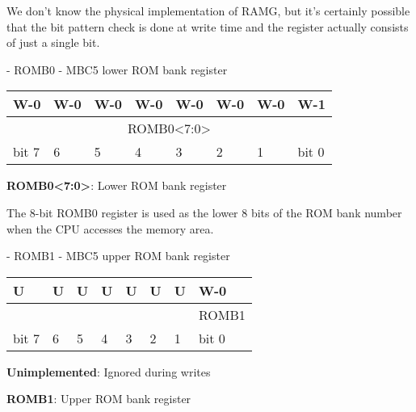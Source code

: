 \begin{speculation}
  We don't know the physical implementation of RAMG, but it's certainly
  possible that the  bit pattern check is done at write time and the
  register actually consists of just a single bit.
\end{speculation}

\begin{register}[H]
  \caption{ - ROMB0 - MBC5 lower ROM bank register}

  {
    \ttfamily
    \begin{tabularx}{\textwidth}{|X|X|X|X|X|X|X|X|}
      \hline
      W-0 & W-0 & W-0 & W-0 & W-0 & W-0 & W-0 & W-1 \\
      \hline
      \multicolumn{8}{|c|}{ROMB0<7:0>} \\
      \hline
      bit 7 & 6 & 5 & 4 & 3 & 2 & 1 & bit 0 \\
      \hline
    \end{tabularx}
  }

  \begin{description}[leftmargin=5em, style=nextline]
    \item[bit 7-0]
      \textbf{ROMB0<7:0>}: Lower ROM bank register \\
  \end{description}
\end{register}

The 8-bit ROMB0 register is used as the lower 8 bits of the ROM bank number
when the CPU accesses the  memory area.

\begin{register}[H]
  \caption{ - ROMB1 - MBC5 upper ROM bank register}

  {
    \ttfamily
    \begin{tabularx}{\textwidth}{|X|X|X|X|X|X|X|X|}
      \hline
      U & U & U & U & U & U & U & W-0 \\
      \hline
      \cellcolor{LightGray} & \cellcolor{LightGray} & \cellcolor{LightGray} & \cellcolor{LightGray} & \cellcolor{LightGray} & \cellcolor{LightGray} & \cellcolor{LightGray} & ROMB1 \\
      \hline
      bit 7 & 6 & 5 & 4 & 3 & 2 & 1 & bit 0 \\
      \hline
    \end{tabularx}
  }

  \begin{description}[leftmargin=5em, style=nextline]
    \item[bit 7-1]
      \textbf{Unimplemented}: Ignored during writes
    \item[bit 0]
      \textbf{ROMB1}: Upper ROM bank register \\
  \end{description}
\end{register}

